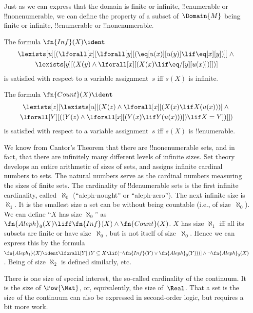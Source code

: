 \documentclass[../../../include/open-logic-section]{subfiles}
\begin{document}


\begin{explain}
Just as we can express that the domain is finite or infinite,
!!{enumerable} or !!{nonenumerable}, we can define the property of a
subset of~$\Domain{M}$ being finite or infinite, !!{enumerable} or
!!{nonenumerable}.
\end{explain}

\begin{prop}
The formula $\fn{Inf}(X) \ident$
\begin{multline*}
\lexists[u][(\lforall[x][\lforall[y][(\eq[u(x)][u(y)] \lif 
      \eq[x][y])]] \land {} \\\lexists[y][(X(y) \land \lforall[x][(X(x)
      \lif \eq/[y][u(x)])]])]
\end{multline*}
is satisfied with respect to a variable assignment~$s$ iff $s(X)$ is
infinite.
\end{prop}

\begin{prop}
The formula $\fn{Count}(X) \ident $
\begin{multline*}
\lexists[z][\lexists[u][(X(z) \land 
    \lforall[x][(X(x) \lif X(u(x)))] \land {} \\ \lforall[Y][((Y(z) \land
      \lforall[x][(Y(x) \lif Y(u(x)))]) \lif X = Y])]])
\end{multline*}
is satisfied with respect to a variable assignment~$s$ iff $s(X)$ is
!!{enumerable}.
\end{prop}

We know from Cantor's Theorem that there are !!{nonenumerable} sets,
and in fact, that there are infinitely many different levels of
infinite sizes.  Set theory develops an entire arithmetic of sizes of
sets, and assigns infinite cardinal numbers to sets.  The natural
numbers serve as the cardinal numbers measuring the sizes of finite
sets. The cardinality of !!{denumerable} sets is the first infinite
cardinality, called~$\aleph_0$ (``aleph-nought'' or
``aleph-zero''). The next infinite size is~$\aleph_1$. It is the
smallest size a set can be without being countable (i.e., of
size~$\aleph_0$).  We can define ``$X$ has size $\aleph_0$'' as
$\fn{Aleph}_0(X) \liff \fn{Inf}(X) \land \fn{Count}(X)$.  $X$ has size
$\aleph_1$ iff all its subsets are finite or have size~$\aleph_0$, but
is not itself of size~$\aleph_0$. Hence we can express this by the
formula $\fn{Aleph_1}(X) \ident \lforall[Y][(Y \subseteq X \lif
  (\lnot\fn{Inf}(Y) \lor \fn{Aleph}_0(Y)))] \land \lnot
\fn{Aleph}_0(X)$. Being of size $\aleph_2$ is defined similarly, etc.

There is one size of special interest, the so-called cardinality of
the continuum.  It is the size of $\Pow{\Nat}$, or, equivalently, the
size of~$\Real$. That a set is the size of the continuum can also be
expressed in second-order logic, but requires a bit more work.
\end{document}
